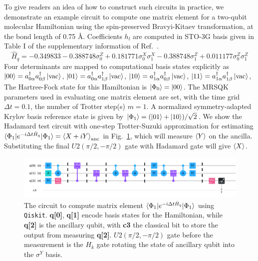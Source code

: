 \documentclass[journal=jctcce,manuscript=article]{achemso}
\newcommand{\methodabbr}[0]{MRSQK\xspace}
\begin{document}
To give readers an idea of how to construct such circuits in practice, we demonstrate an example circuit to compute one matrix element for a two-qubit molecular  Hamiltonian\cite{OMalley:2016dc} using the spin-preserved Bravyi-Kitaev transformation,\cite{Seeley:2012em, Bravyi:2017wb} at the bond length of 0.75 \AA. Coefficients $h_l$ are computed in STO-3G basis given in Table I of the supplementary information of Ref.~. 
\begin{equation}
\hat{H}_q = -0.349833 - 0.388748\sigma_0^Z  + 0.181771\sigma_0^X \sigma_1^X - 0.388748 \sigma_1^Z + 0.011177\sigma_0^Z \sigma_1^Z
\end{equation}
Four determinants are mapped to computational basis states explicitly as 
$\left\vert{00}\right\rangle = a_{0 \alpha}^{\dagger} a_{0 \beta}^{\dagger}  \left\vert{\mathrm{vac}}\right\rangle$, 
$\left\vert{01}\right\rangle = a_{0 \alpha}^{\dagger} a_{1 \beta}^{\dagger}  \left\vert{\mathrm{vac}}\right\rangle$, 
$\left\vert{10}\right\rangle = a_{1 \alpha}^{\dagger} a_{0 \beta}^{\dagger}  \left\vert{\mathrm{vac}}\right\rangle$, 
$\left\vert{11}\right\rangle = a_{1 \alpha}^{\dagger} a_{1 \beta}^{\dagger}  \left\vert{\mathrm{vac}}\right\rangle$, 
The Hartree-Fock state for this Hamiltonian is $\left\vert{\Phi_0}\right\rangle = \left\vert{00}\right\rangle$.
The \methodabbr parameters used in evaluating one matrix element are set, with the time grid $\Delta t = 0.1$, the number of Trotter step(s) $m=1$. A normalized symmetry-adapted Krylov basis reference state is given by $\left\vert{\Phi_1}\right\rangle= (\left\vert{01}\right\rangle + \left\vert{10}\right\rangle ) / \sqrt{2}$. 
We show the Hadamard test circuit with one-step Trotter-Suzuki approximation for estimating $\braket{\Phi_1  | e^{-i \Delta t \hat{H}_q }  |  \Phi_1} = \braket{X+iY}_\mathrm{anc}$ in Fig.~\ref{h2_cir}, which will measure $\braket{Y}$ on the ancilla. Substituting the final $U2(\pi/2, -\pi/2)$ gate with Hadamard gate will give $\braket{X}$. 
\begin{figure}[h!]
\centering
\includegraphics[width=6.5in]{figs/phi1_cir4y.pdf}
\caption{The circuit to compute matrix element $\braket{\Phi_1  | e^{-i \Delta t \hat{H}_q}  |  \Phi_1}$ using \texttt{Qiskit}. \textbf{q[0]}, \textbf{q[1] }encode basis states for the Hamiltonian, while \textbf{q[2]} is the ancillary qubit, with \textbf{c3} the classical bit to store the output from measuring \textbf{q[2]}. $U2(\pi/2, -\pi/2)$ gate before the measurement is the $H_k$ gate rotating the state of ancillary qubit into the $\sigma^Y$ basis.  }
\label{h2_cir}
\end{figure}
\end{document}
